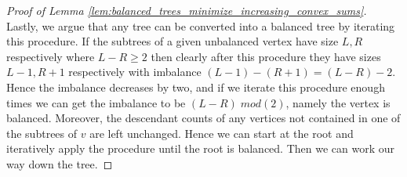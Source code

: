 \documentclass[10pt,a4paper]{amsart}
\renewcommand{\geq}{\geqslant}
\begin{document}
\begin{proof}[Proof of Lemma \ref{lem:balanced_trees_minimize_increasing_convex_sums}]
Lastly, we argue that any tree can be converted into a balanced tree by iterating this procedure. If the subtrees of a given unbalanced vertex have size $L,R$ respectively where $L-R \geq 2$ then clearly after this procedure they have sizes $L-1, R+1$ respectively with imbalance $(L-1) - (R+1) = (L-R) - 2$. Hence the imbalance decreases by two, and if we iterate this procedure enough times we can get the imbalance to be $(L-R) \; mod(2)$, namely the vertex is balanced. Moreover, the descendant counts of any vertices not contained in one of the subtrees of $v$ are left unchanged. Hence we can start at the root and iteratively apply the procedure until the root is balanced. Then we can work our way down the tree. 
\end{proof}
\end{document}
